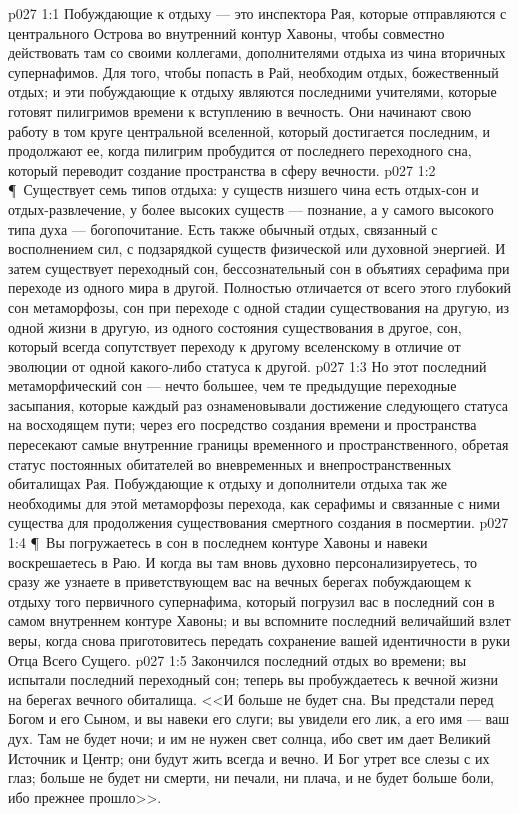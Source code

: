 \vs p027 1:1 Побуждающие к отдыху --- это инспектора Рая, которые отправляются с центрального Острова во внутренний контур Хавоны, чтобы совместно действовать там со своими коллегами, дополнителями отдыха из чина вторичных супернафимов. Для того, чтобы попасть в Рай, необходим отдых, божественный отдых; и эти побуждающие к отдыху являются последними учителями, которые готовят пилигримов времени к вступлению в вечность. Они начинают свою работу в том круге центральной вселенной, который достигается последним, и продолжают ее, когда пилигрим пробудится от последнего переходного сна, который переводит создание пространства в сферу вечности.
\vs p027 1:2 \P\ Существует семь типов отдыха: у существ низшего чина есть отдых\hyp{}сон и отдых\hyp{}развлечение, у более высоких существ --- познание, а у самого высокого типа духа --- богопочитание. Есть также обычный отдых, связанный с восполнением сил, с подзарядкой существ физической или духовной энергией. И затем существует переходный сон, бессознательный сон в объятиях серафима при переходе из одного мира в другой. Полностью отличается от всего этого глубокий сон метаморфозы, сон при переходе с одной стадии существования на другую, из одной жизни в другую, из одного состояния существования в другое, сон, который всегда сопутствует переходу к другому вселенскому  в отличие от эволюции от одной  какого\hyp{}либо статуса к другой.
\vs p027 1:3 Но этот последний метаморфический сон --- нечто большее, чем те предыдущие переходные засыпания, которые каждый раз ознаменовывали достижение следующего статуса на восходящем пути; через его посредство создания времени и пространства пересекают самые внутренние границы временного и пространственного, обретая статус постоянных обитателей во вневременных и внепространственных обиталищах Рая. Побуждающие к отдыху и дополнители отдыха так же необходимы для этой метаморфозы перехода, как серафимы и связанные с ними существа для продолжения существования смертного создания в посмертии.
\vs p027 1:4 \P\ Вы погружаетесь в сон в последнем контуре Хавоны и навеки воскрешаетесь в Раю. И когда вы там вновь духовно персонализируетесь, то сразу же узнаете в приветствующем вас на вечных берегах побуждающем к отдыху того первичного супернафима, который погрузил вас в последний сон в самом внутреннем контуре Хавоны; и вы вспомните последний величайший взлет веры, когда снова приготовитесь передать сохранение вашей идентичности в руки Отца Всего Сущего.
\vs p027 1:5 Закончился последний отдых во времени; вы испытали последний переходный сон; теперь вы пробуждаетесь к вечной жизни на берегах вечного обиталища. <<И больше не будет сна. Вы предстали перед Богом и его Сыном, и вы навеки его слуги; вы увидели его лик, а его имя --- ваш дух. Там не будет ночи; и им не нужен свет солнца, ибо свет им дает Великий Источник и Центр; они будут жить всегда и вечно. И Бог утрет все слезы с их глаз; больше не будет ни смерти, ни печали, ни плача, и не будет больше боли, ибо прежнее прошло>>.
